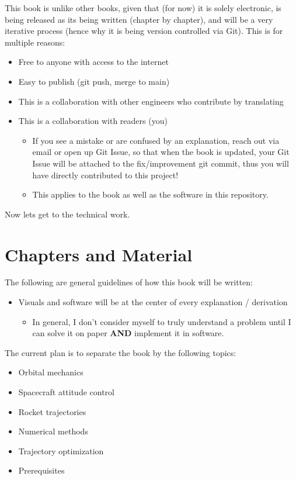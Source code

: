 \documentclass{article}
\begin{document}
This book is unlike other books, given that (for now) it is solely electronic, is being released as its being written (chapter by chapter),
and will be a very iterative process (hence why it is being version controlled via Git). This is for multiple reasons:
\begin{itemize}
	\item Free to anyone with access to the internet
	\item Easy to publish (git push, merge to main)
	\item This is a collaboration with other engineers who contribute by translating
	\item This is a collaboration with readers (you)
	\begin{itemize}
		\item If you see a mistake or are confused by an explanation, reach out
		via email or open up Git Issue, so that when the book is updated, your
		Git Issue will be attached to the fix/improvement git commit, thus you will have
		directly contributed to this project!
		\item This applies to the book as well as the software in this repository.
	\end{itemize}
\end{itemize}

Now lets get to the technical work.

\section{Chapters and Material}
The following are general guidelines of how this book will be written:
\begin{itemize}
	\item Visuals and software will be at the center of every explanation / derivation
	\begin{itemize}
		\item In general, I don't consider myself to truly understand a problem until I can solve it on paper \textbf{AND} implement it in software.
	\end{itemize}

\end{itemize}

\noindent
The current plan is to separate the book by the following topics:
\begin{itemize}
	\item Orbital mechanics
	\item Spacecraft attitude control
	\item Rocket trajectories
	\item Numerical methods
	\item Trajectory optimization
	\item Prerequisites
\end{itemize}
 
\end{document}
